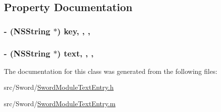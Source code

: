 \subsection{Property Documentation}
\hypertarget{interface_sword_module_text_entry_a10a0815bfcf8afc08291f09bb4a0c086}{
\subsubsection[{key}]{\setlength{\rightskip}{0pt plus 5cm}-\/ (N\-S\-String $\ast$) key\hspace{0.3cm}{\ttfamily [read]}, {\ttfamily [write]}, {\ttfamily [atomic]}, {\ttfamily [retain]}}}\label{interface_sword_module_text_entry_a10a0815bfcf8afc08291f09bb4a0c086}
\hypertarget{interface_sword_module_text_entry_af2db62cd230bc0a10cea4e7630ac9e07}{
\subsubsection[{text}]{\setlength{\rightskip}{0pt plus 5cm}-\/ (N\-S\-String $\ast$) text\hspace{0.3cm}{\ttfamily [read]}, {\ttfamily [write]}, {\ttfamily [atomic]}, {\ttfamily [retain]}}}\label{interface_sword_module_text_entry_af2db62cd230bc0a10cea4e7630ac9e07}


The documentation for this class was generated from the following files\-:\begin{DoxyCompactItemize}
\item 
src/\-Sword/\hyperlink{_sword_module_text_entry_8h}{Sword\-Module\-Text\-Entry.\-h}\item 
src/\-Sword/\hyperlink{_sword_module_text_entry_8m}{Sword\-Module\-Text\-Entry.\-m}\end{DoxyCompactItemize}
